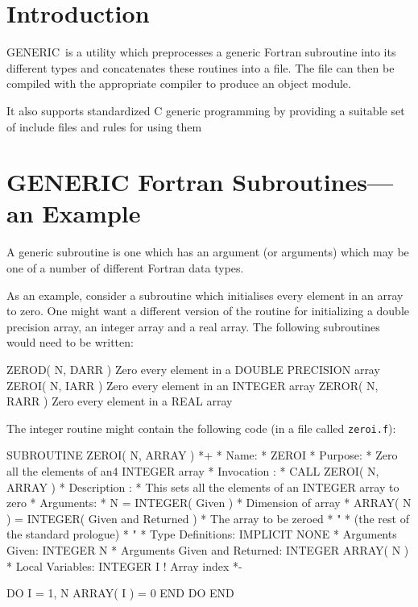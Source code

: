 \documentclass[twoside,11pt,nolof]{starlink}
\providecommand{\GENERIC}{{\footnotesize GENERIC}\normalsize}
\begin{document}
\scfrontmatter


\section{Introduction}

\GENERIC\ is a utility which preprocesses a generic Fortran subroutine
into its different types and concatenates these routines into a file.
The file can then be compiled with the appropriate compiler to produce an
object module.

It also supports standardized C generic programming by providing a suitable
set of include files and rules for using them

\section{GENERIC Fortran Subroutines---an Example}

A generic subroutine is one which has an argument (or arguments)
which may be one of a number of different Fortran data types.

As an example, consider a subroutine which initialises every
element in an array to zero.
One might want a different version of the routine for initializing
a double precision array, an integer array and a real array.
The following subroutines would need to be written:

\begin{terminalv}
      ZEROD( N, DARR )   Zero every element in a DOUBLE PRECISION array
      ZEROI( N, IARR )   Zero every element in an INTEGER array
      ZEROR( N, RARR )   Zero every element in a REAL array
\end{terminalv}

The integer routine might contain the following code (in a file
called \texttt{zeroi.f}):

\begin{terminalv}
          SUBROUTINE ZEROI( N, ARRAY )
    *+
    *  Name:
    *     ZEROI
    *  Purpose:
    *     Zero all the elements of an4 INTEGER array
    *  Invocation :
    *     CALL ZEROI( N, ARRAY )
    *  Description :
    *     This sets all the elements of an INTEGER array to zero
    *  Arguments:
    *     N = INTEGER( Given )
    *        Dimension of array
    *     ARRAY( N ) = INTEGER( Given and Returned )
    *        The array to be zeroed
    *                   "
    *     (the rest of the standard prologue)
    *                   "
    *  Type Definitions:
          IMPLICIT NONE
    *  Arguments Given:
          INTEGER N
    *  Arguments Given and Returned:
          INTEGER ARRAY( N )
    *  Local Variables:
          INTEGER I                   ! Array index
    *-

          DO I = 1, N
             ARRAY( I ) = 0
          END DO
          END
\end{terminalv}
\end{document}
